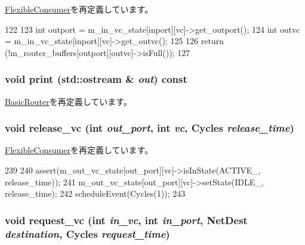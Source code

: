 \hyperlink{classFlexibleConsumer_aa3732d20c1f3f94fb27ef60ac660f363}{FlexibleConsumer}を再定義しています。


\begin{DoxyCode}
122 {
123     int outport = m_in_vc_state[inport][vc]->get_outport();
124     int outvc = m_in_vc_state[inport][vc]->get_outvc();
125 
126     return (!m_router_buffers[outport][outvc]->isFull());
127 }
\end{DoxyCode}
\hypertarget{classRouter_ac55fe386a101fbae38c716067c9966a0}{
\subsubsection[{print}]{\setlength{\rightskip}{0pt plus 5cm}void print (std::ostream \& {\em out}) const}}
\label{classRouter_ac55fe386a101fbae38c716067c9966a0}


\hyperlink{classBasicRouter_ac55fe386a101fbae38c716067c9966a0}{BasicRouter}を再定義しています。\hypertarget{classRouter_adced7fd7d25eb0d6a869fff14085e8c3}{
\subsubsection[{release\_\-vc}]{\setlength{\rightskip}{0pt plus 5cm}void release\_\-vc (int {\em out\_\-port}, \/  int {\em vc}, \/  {\bf Cycles} {\em release\_\-time})}}
\label{classRouter_adced7fd7d25eb0d6a869fff14085e8c3}


\hyperlink{classFlexibleConsumer_a54d4f8948ced53110ed96024a64adf7e}{FlexibleConsumer}を再定義しています。


\begin{DoxyCode}
239 {
240     assert(m_out_vc_state[out_port][vc]->isInState(ACTIVE_, release_time));
241     m_out_vc_state[out_port][vc]->setState(IDLE_, release_time);
242     scheduleEvent(Cycles(1));
243 }
\end{DoxyCode}
\hypertarget{classRouter_ac2db714adfe0dfd2c3ac2b88bd6a5308}{
\subsubsection[{request\_\-vc}]{\setlength{\rightskip}{0pt plus 5cm}void request\_\-vc (int {\em in\_\-vc}, \/  int {\em in\_\-port}, \/  {\bf NetDest} {\em destination}, \/  {\bf Cycles} {\em request\_\-time})}}
\label{classRouter_ac2db714adfe0dfd2c3ac2b88bd6a5308}


